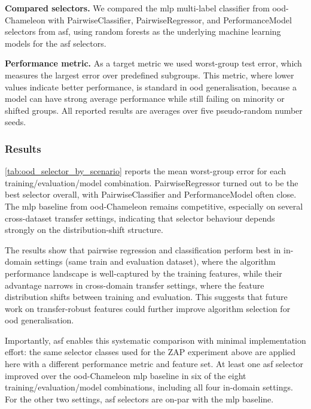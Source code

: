 \textbf{Compared selectors.} We compared the \gls{mlp} multi-label classifier from \gls{ood}-Chameleon with PairwiseClassifier, PairwiseRegressor, and PerformanceModel selectors from \gls{asf}, using random forests as the underlying machine learning models for the \gls{asf} selectors. 

\textbf{Performance metric.} As a target metric we used worst-group test error, which measures the largest error over predefined subgroups. This metric, where lower values indicate better performance, is standard in \gls{ood} generalisation, because a model can have strong average performance while still failing on minority or shifted groups. All reported results are averages over five pseudo-random number seeds.

\subsubsection{Results}
\autoref{tab:ood_selector_by_scenario} reports the mean worst-group error for each training/evaluation/model combination. PairwiseRegressor turned out to be the best selector overall, with PairwiseClassifier and PerformanceModel often close. The \gls{mlp} baseline from \gls{ood}-Chameleon remains competitive, especially on several cross-dataset transfer settings, indicating that selector behaviour depends strongly on the distribution-shift structure.

The results show that pairwise regression and classification perform best in in-domain settings (same train and evaluation dataset), where the algorithm performance landscape is well-captured by the training features, while their advantage narrows in cross-domain transfer settings, where the feature distribution shifts between training and evaluation. This suggests that future work on transfer-robust features could further improve algorithm selection for \gls{ood} generalisation. 

Importantly, \gls{asf} enables this systematic comparison with minimal implementation effort: the same selector classes used for the ZAP experiment above are applied here with a different performance metric and feature set. At least one \gls{asf} selector improved over the \gls{ood}-Chameleon \gls{mlp} baseline in six of the eight training/evaluation/model combinations, including all four in-domain settings. For the other two settings, \gls{asf} selectors are on-par with the \gls{mlp} baseline. 

